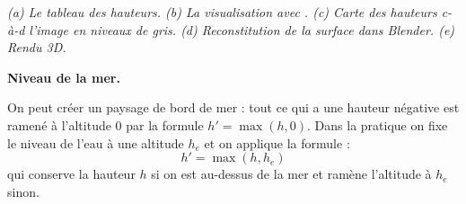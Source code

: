 \documentclass[11pt,class=report,crop=false]{standalone}
\begin{document}
\begin{exemple}
\begin{center}
\smallskip

\nopagebreak

\begin{minipage}{0.8\textwidth}
\center\emph{
(a) Le tableau des hauteurs. 
(b) La visualisation \Python{} avec \matplotlib.
(c) Carte des hauteurs c-à-d l'image en niveaux de gris.
(d) Reconstitution de la surface dans \textsl{Blender}.
(e) Rendu 3D.}
\end{minipage}

\end{center}


\end{exemple}




\textbf{Niveau de la mer.}

On peut créer un paysage de bord de mer : tout ce qui a une hauteur négative est ramené à l'altitude $0$ par la formule $h'= \max(h,0)$. Dans la pratique on fixe le niveau de l'eau à une altitude $h_e$ et on applique la formule :
$$h' = \max(h,h_e)$$
qui conserve la hauteur $h$ si on est au-dessus de la mer et ramène l'altitude à $h_e$ sinon.
\end{document}
